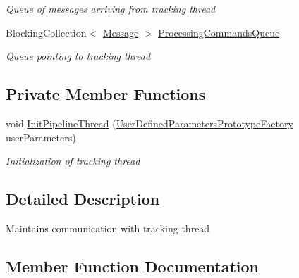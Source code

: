 \begin{DoxyCompactItemize}
\begin{DoxyCompactList}\small\item\em Queue of messages arriving from tracking thread \end{DoxyCompactList}\item 
Blocking\+Collection$<$ \mbox{\hyperlink{class_chess_tracking_1_1_multithreading_messages_1_1_message}{Message}} $>$ \mbox{\hyperlink{class_chess_tracking_1_1_controlling_elements_1_1_tracking_manager_aee8b76218258f5f3ec6d4bb39bec4901}{Processing\+Commands\+Queue}}
\begin{DoxyCompactList}\small\item\em Queue pointing to tracking thread \end{DoxyCompactList}\end{DoxyCompactItemize}
\subsection*{Private Member Functions}
\begin{DoxyCompactItemize}
\item 
void \mbox{\hyperlink{class_chess_tracking_1_1_controlling_elements_1_1_tracking_manager_af0adf3ec805f8b8ce898fe6d7dfc77ff}{Init\+Pipeline\+Thread}} (\mbox{\hyperlink{class_chess_tracking_1_1_image_processing_1_1_pipeline_data_1_1_user_defined_parameters_prototype_factory}{User\+Defined\+Parameters\+Prototype\+Factory}} user\+Parameters)
\begin{DoxyCompactList}\small\item\em Initialization of tracking thread \end{DoxyCompactList}\end{DoxyCompactItemize}


\subsection{Detailed Description}
Maintains communication with tracking thread 



\subsection{Member Function Documentation}
\mbox{\label{class_chess_tracking_1_1_controlling_elements_1_1_tracking_manager_af0adf3ec805f8b8ce898fe6d7dfc77ff}} 
